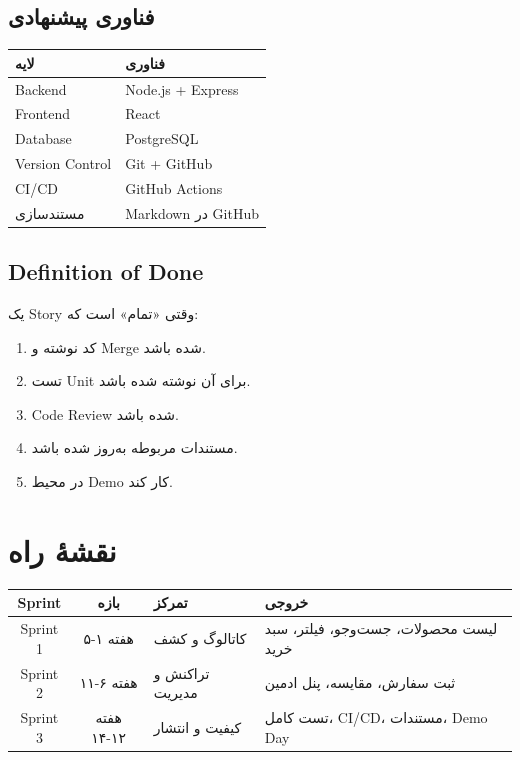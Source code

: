\documentclass[12pt, a4paper]{article}
\begin{document}
\subsection{فناوری پیشنهادی}
\begin{center}
\begin{tabular}{|l|l|}
\hline
\textbf{لایه} & \textbf{فناوری} \\
\hline
Backend & Node.js + Express \\
\hline
Frontend & React \\
\hline
Database & PostgreSQL \\
\hline
Version Control & Git + GitHub \\
\hline
CI/CD & GitHub Actions \\
\hline
مستندسازی & Markdown در GitHub \\
\hline
\end{tabular}
\end{center}

\subsection{Definition of Done}
یک Story وقتی «تمام» است که:
\begin{enumerate}
    \item کد نوشته و Merge شده باشد.
    \item تست Unit برای آن نوشته شده باشد.
    \item Code Review شده باشد.
    \item مستندات مربوطه به‌روز شده باشد.
    \item در محیط Demo کار کند.
\end{enumerate}

\section{نقشهٔ راه}

\begin{center}
\begin{tabular}{|c|c|p{4cm}|p{4.5cm}|}
\hline
\textbf{Sprint} & \textbf{بازه} & \textbf{تمرکز} & \textbf{خروجی} \\
\hline
Sprint 1 & هفته ۱-۵ & کاتالوگ و کشف & لیست محصولات، جست‌وجو، فیلتر، سبد خرید \\
\hline
Sprint 2 & هفته ۶-۱۱ & تراکنش و مدیریت & ثبت سفارش، مقایسه، پنل ادمین \\
\hline
Sprint 3 & هفته ۱۲-۱۴ & کیفیت و انتشار & تست کامل، CI/CD، مستندات، Demo Day \\
\hline
\end{tabular}
\end{center}
\end{document}
